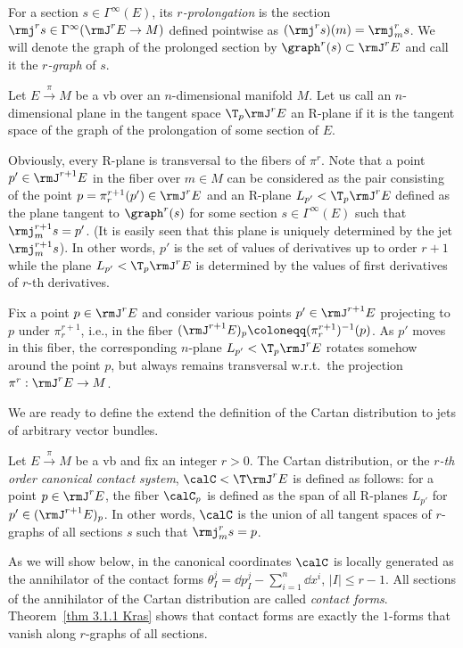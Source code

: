 For a section $s\in \Gamma^\infty(E)$, its \emph{$r$-prolongation} is the section $\rmj^r s\in \Gamma^\infty(\rmJ^rE\to M)$ defined pointwise as $(\rmj^r s)(m)=\rmj_m^r s$. We will denote the graph of the prolonged section by $\graph^r(s)\subset \rmJ^rE$ and call it the \emph{$r$-graph} of $s$.

\begin{defn}[R-plane]\label{def R-plane}
    Let $E\overset{\pi}{\to}M$ be a \gls{vb} over an $n$-dimensional manifold $M$. Let us call an $n$-dimensional plane in the tangent space $\T_p \rmJ^rE$ an R-plane if it is the tangent space of the graph of the prolongation of some section of $E$.
\end{defn}

\begin{rem}\label{jets and R-planes}
    Obviously, every R-plane is transversal to the fibers of $\pi^r$. Note that a point $p'\in \rmJ^{r+1}E$ in the fiber over $m\in M$ can be considered as the pair consisting of the point $p=\pi^{r+1}_r(p')\in \rmJ^rE$ and an R-plane $L_{p'}<\T_p \rmJ^rE$ defined as the plane tangent to $\graph^r(s)$ for some section $s\in\Gamma^\infty(E)$ such that $\rmj^{r+1}_m s=p'$. (It is easily seen that this plane is uniquely determined by the jet $\rmj^{r+1}_m s$). In other words, $p'$ is the set of values of derivatives up to order $r+1$ while the plane $L_{p'}<\T_p \rmJ^rE$ is determined by the values of first derivatives of $r$-th derivatives.
\end{rem}

Fix a point $p\in \rmJ^rE$ and consider various points $p'\in \rmJ^{r+1}E$ projecting to $p$ under $\pi^{r+1}_r$, i.e., in the fiber $(\rmJ^{r+1}E)_p\coloneqq (\pi^{r+1}_r)^{-1}(p)$. As $p'$ moves in this fiber, the corresponding $n$-plane $L_{p'}<\T_p\rmJ^rE$ rotates somehow around the point $p$, but always remains transversal w.r.t.\ the projection $\pi^r:\rmJ^rE\to M$. 

We are ready to define the extend the definition of the Cartan distribution to jets of arbitrary vector bundles.

\begin{defn}
    Let $E\overset{\pi}{\to} M$ be a \gls{vb} and fix an integer $r>0$. The Cartan distribution, or the \emph{$r$-th order canonical contact system}, $\calC<\T \rmJ^rE$ is defined as follows: for a point $p\in \rmJ^rE$, the fiber $\calC_p$ is defined as the span of all R-planes $L_{p'}$ for $p'\in (\rmJ^{r+1}E)_p$. In other words, $\calC$ is the union of all tangent spaces of $r$-graphs of all sections $s$ such that $\rmj^r_m s=p$.

    As we will show below, in the canonical coordinates $\calC$ is locally generated as the annihilator of the contact forms $\theta^j_I=\dd p^j_I-\sum_{i=1}^n \dd x^i$, $|I|\leq r-1$. All sections of the annihilator of the Cartan distribution are called \emph{contact forms}. Theorem~\ref{thm 3.1.1 Kras} shows that contact forms are exactly the $1$-forms that vanish along $r$-graphs of all sections.
\end{defn}

